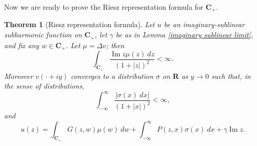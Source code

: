 \documentclass[12pt]{report}
\newcommand{\RR}{\mathbf{R}}
\newcommand{\CC}{\mathbf{C}}
\renewcommand{\Im}{\operatorname{Im}}
\newtheorem{theorem}{Theorem}[chapter]
\theoremstyle{definition}
\begin{document}
Now we are ready to prove the Riesz representation formula for $\CC_+$.
\begin{theorem}[Riesz representation formula]
    Let $u$ be an imaginary-sublinear subharmonic function on $\CC_+$, let $\gamma$ be as in Lemma \ref{imaginary sublinear limit}, and fix any $w \in \CC_+$. Let $\mu = \Delta v$; then
    \begin{equation}\label{estimate on mu}\int_{\CC_+} \frac{\Im z \mu(z) ~dz}{(1 + |z|)^2} < \infty.\end{equation}
    Moreover $v(\cdot + iy)$ converges to a distribution $\sigma$ on $\RR$ as $y \to 0$ such that, in the sense of distributions,
\begin{equation}\label{estimate on sigma}\int_{-\infty}^\infty \frac{|\sigma(x) ~dx|}{(1 + |x|)^2} < \infty,\end{equation}
    and
\begin{equation}\label{riesz formula}u(z) = \int_{\CC_+} G(z, w) \mu(w) ~dw + \int_{-\infty}^\infty P(z, x) \sigma(x) ~dx + \gamma \Im z.\end{equation}
\end{theorem}
\end{document}
